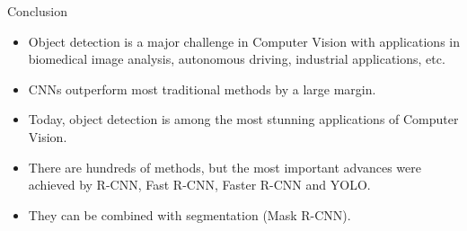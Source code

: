 \documentclass[xcolor=pdftex,dvipsnames,table]{beamer}
\begin{document}


\begin{frame}{Conclusion}
\begin{itemize}
\item Object detection is a major challenge in Computer Vision with applications in biomedical image analysis, autonomous driving, industrial applications, etc.
\item CNNs outperform most traditional methods by a large margin. 
\item Today, object detection is among the most stunning applications of Computer Vision. 
\item There are hundreds of methods, but the most important advances were achieved by R-CNN, Fast R-CNN, Faster R-CNN and YOLO. 
\item They can be combined with segmentation (Mask R-CNN). 
\end{itemize}
\end{frame}
\end{document}
